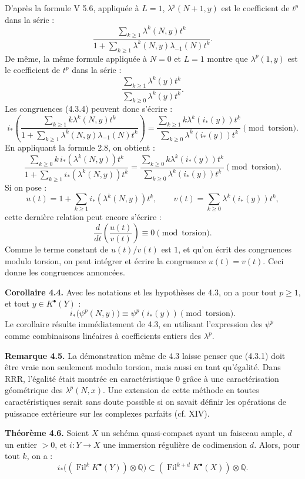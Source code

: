 \documentclass[11pt]{article}
\newcommand{\Fil}{\operatorname{Fil}}
\newcommand{\RRR}{\mathrm{RRR}}
\begin{document}
D'après la formule V 5.6, appliquée à \(L=1\), \(\lambda^p(N+1,y)\) est le coefficient de \(t^p\) dans la série :
\[
  \frac{\sum_{k\ge1}\lambda^k(N,y)t^k}
       {1+\sum_{k\ge1}\lambda^k(N,y)\lambda_{-1}(N)t^k}.
\]
De même, la même formule appliquée à \(N=0\) et \(L=1\) montre que \(\lambda^p(1,y)\) est le coefficient de \(t^p\) dans la série :
\[
  \frac{\sum_{k\ge1}\lambda^k(y)t^k}
       {\sum_{k\ge0}\lambda^k(y)t^k}.
\]
Les congruences (4.3.4) peuvent donc s'écrire :
\[
i_*\left(
  \frac{\sum_{k\ge1}k\lambda^k(N,y)t^k}
       {1+\sum_{k\ge1}\lambda^k(N,y)\lambda_{-1}(N)t^k}
\right)
=
  \frac{\sum_{k\ge1}k\lambda^k(i_*(y))t^k}
       {\sum_{k\ge0}\lambda^k(i_*(y))t^k}
       \pmod{\text{torsion}}.
\]
En appliquant la formule 2.8, on obtient :
\[
  \frac{\sum_{k\ge0}k\,i_*(\lambda^k(N,y))t^k}
       {1+\sum_{k\ge1} i_*(\lambda^k(N,y))t^k}
  =
  \frac{\sum_{k\ge0}k\lambda^k(i_*(y))t^k}
       {\sum_{k\ge0}\lambda^k(i_*(y))t^k}
       \pmod{\text{torsion}}.
\]
Si on pose :
\[
  u(t)=1+\sum_{k\ge1}i_*(\lambda^k(N,y))t^k,\qquad
  v(t)=\sum_{k\ge0}\lambda^k(i_*(y))t^k,
\]
cette dernière relation peut encore s'écrire :
\[
  \frac{d}{dt}\!\left(\frac{u(t)}{v(t)}\right)\equiv0
  \pmod{\text{torsion}}.
\]
Comme le terme constant de \(u(t)/v(t)\) est \(1\), et qu'on écrit des congruences modulo torsion, on peut intégrer et écrire la congruence \(u(t)=v(t)\). Ceci donne les congruences annoncées.

\textbf{Corollaire 4.4.} Avec les notations et les hypothèses de 4.3, on a pour tout \(p\ge1\), et tout \(y\in K^\bullet(Y)\) :
\[
  i_*\bigl(\psi^p(N,y)\bigr)\equiv \psi^p(i_*(y))
  \pmod{\text{torsion}}.
\]
Le corollaire résulte immédiatement de 4.3, en utilisant l'expression des \(\psi^p\) comme combinaisons linéaires à coefficients entiers des \(\lambda^p\).

\textbf{Remarque 4.5.} La démonstration même de 4.3 laisse penser que (4.3.1) doit être vraie non seulement modulo torsion, mais aussi en tant qu'égalité. Dans \(\RRR\), l'égalité était montrée en caractéristique \(0\) grâce à une caractérisation géométrique des \(\lambda^p(N,x)\). Une extension de cette méthode en toutes caractéristiques serait sans doute possible si on savait définir les opérations de puissance extérieure sur les complexes parfaits (cf. XIV).

\textbf{Théorème 4.6.} Soient \(X\) un schéma quasi-compact ayant un faisceau ample, \(d\) un entier \(>0\), et \(i:Y\to X\) une immersion régulière de codimension \(d\). Alors, pour tout \(k\), on a :
\[
 i_*\bigl((\Fil^kK^\bullet(Y))\otimes\mathbb Q\bigr)
 \subset
 (\Fil^{k+d}K^\bullet(X))\otimes\mathbb Q.
\]
\end{document}
